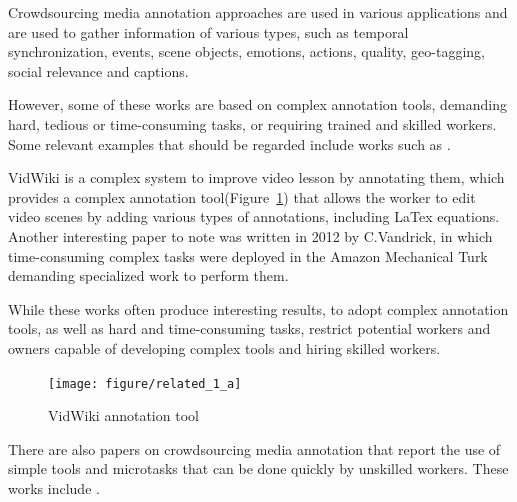 Crowdsourcing media annotation approaches are used in various applications and are used to gather information of various types, such as temporal synchronization\cite{wu2014crowdsourced,wfa2016}, events\cite{Kim:2014:JSL:2679600.2680027,sulser2014crowd}, scene objects\cite{vidwiki2014,pinto2013tag4vd}, emotions\cite{sanchez2015mood,biel2013youtube}, actions\cite{riek2011guess,desell2015effectiveness}, quality\cite{freiburg2011crowdsourcing,han2014quality}, geo-tagging\cite{chen2015crowd,gottlieb2012pushing}, social relevance\cite{santos2014towards,huron2013polemictweet,bertini2013socially} and captions\cite{deshpande2014crowdsourcing,kacorri2014introducing}. 

However, some of these works are based on complex annotation tools, demanding hard, tedious or time-consuming tasks, or requiring trained and skilled workers. Some relevant examples that should be regarded include works such as \cite{vidwiki2014,Vondrick:2013:ESU:2436010.2436013,park2014toward,biel2013youtube,desell2015effectiveness,gottlieb2012pushing,huron2013polemictweet}.

VidWiki\cite{vidwiki2014} is a complex system to improve video lesson by annotating them, which provides a complex annotation tool(Figure~\ref{related_1_a}) that allows the worker to edit video scenes by adding various types of annotations, including LaTex equations. Another interesting paper to note was written in 2012 by C.Vandrick\cite{Vondrick:2013:ESU:2436010.2436013}, in which time-consuming complex tasks were deployed in the Amazon Mechanical Turk\cite{gottlieb2012pushing} demanding specialized work to perform them. 

While these works often produce interesting results, to adopt complex annotation tools, as well as hard and time-consuming tasks, restrict potential workers and owners capable of developing complex tools and hiring skilled workers.

\begin{figure}[h]
	\centerline{\texttt{[image: figure/related\_1\_a]}}
	\caption{VidWiki annotation tool\cite{vidwiki2014}}
	\label{related_1_a}
\end{figure} 

There are also papers on crowdsourcing media annotation that report the use of simple tools and microtasks that can be done quickly by unskilled workers. These works include \cite{Chen:2017:RIM:3025453.3025969,Kim:2014:JSL:2679600.2680027,riek2011guess,gadgil2014web,wfa2016,wu2014crowdsourced,pinto2013tag4vd,sulser2014crowd}.

